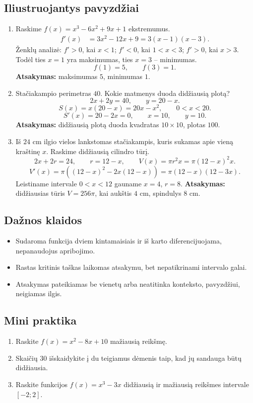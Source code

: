 \subsection{Iliustruojantys pavyzdžiai}
\begin{enumerate}[label=\arabic*.]
\item Raskime \(f(x)=x^3-6x^2+9x+1\) ekstremumus.
\begin{align}
f'(x)&=3x^2-12x+9=3(x-1)(x-3).
\end{align}
Ženklų analizė: \(f'>0\), kai \(x<1\); \(f'<0\), kai \(1<x<3\); \(f'>0\), kai \(x>3\). Todėl ties \(x=1\) yra maksimumas, ties \(x=3\) -- minimumas.
\[
f(1)=5,\qquad f(3)=1.
\]
\textbf{Atsakymas:} maksimumas \(5\), minimumas \(1\).

\item Stačiakampio perimetras \(40\). Kokie matmenys duoda didžiausią plotą?
\[
2x+2y=40,\qquad y=20-x.
\]
\[
S(x)=x(20-x)=20x-x^2,\qquad 0<x<20.
\]
\[
S'(x)=20-2x=0,\qquad x=10,\qquad y=10.
\]
\textbf{Atsakymas:} didžiausią plotą duoda kvadratas \(10\times10\), plotas \(100\).

\item Iš \(24\) cm ilgio vielos lankstomas stačiakampis, kuris sukamas apie vieną kraštinę \(x\). Raskime didžiausią cilindro tūrį.
\[
2x+2r=24,\qquad r=12-x,\qquad V(x)=\pi r^2x=\pi(12-x)^2x.
\]
\[
V'(x)=\pi\left((12-x)^2-2x(12-x)\right)=\pi(12-x)(12-3x).
\]
Leistiname intervale \(0<x<12\) gauname \(x=4\), \(r=8\).
\textbf{Atsakymas:} didžiausias tūris \(V=256\pi\), kai aukštis \(4\) cm, spindulys \(8\) cm.
\end{enumerate}

\subsection{Dažnos klaidos}
\begin{itemize}
\item Sudaroma funkcija dviem kintamaisiais ir iš karto diferencijuojama, nepanaudojus apribojimo.
\item Rastas kritinis taškas laikomas atsakymu, bet nepatikrinami intervalo galai.
\item Atsakymas pateikiamas be vienetų arba neatitinka konteksto, pavyzdžiui, neigiamas ilgis.
\end{itemize}

\subsection{Mini praktika}
\begin{enumerate}[label=\alph*)]
\item Raskite \(f(x)=x^2-8x+10\) mažiausią reikšmę.
\item Skaičių \(30\) išskaidykite į du teigiamus dėmenis taip, kad jų sandauga būtų didžiausia.
\item Raskite funkcijos \(f(x)=x^3-3x\) didžiausią ir mažiausią reikšmes intervale \([-2;2]\).
\end{enumerate}

